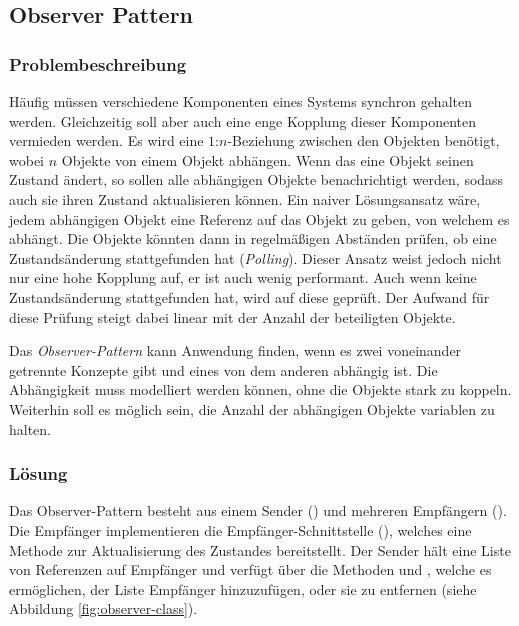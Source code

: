 \subsection{Observer Pattern}


\subsubsection*{Problembeschreibung}

Häufig müssen verschiedene Komponenten eines Systems synchron gehalten werden. Gleichzeitig soll aber auch eine enge Kopplung dieser Komponenten vermieden werden. Es wird eine $1$:$n$-Beziehung zwischen den Objekten benötigt, wobei $n$ Objekte von einem Objekt abhängen. Wenn das eine Objekt seinen Zustand ändert, so sollen alle abhängigen Objekte benachrichtigt werden, sodass auch sie ihren Zustand aktualisieren können. Ein naiver Lösungsansatz wäre, jedem abhängigen Objekt eine Referenz auf das Objekt zu geben, von welchem es abhängt. Die Objekte könnten dann in regelmäßigen Abständen prüfen, ob eine Zustandsänderung stattgefunden hat (\emph{Polling}). Dieser Ansatz weist jedoch nicht nur eine hohe Kopplung auf, er ist auch wenig performant. Auch wenn keine Zustandsänderung stattgefunden hat, wird auf diese geprüft. Der Aufwand für diese Prüfung steigt dabei linear mit der Anzahl der beteiligten Objekte.

Das \emph{Observer-Pattern} kann Anwendung finden, wenn es zwei voneinander getrennte Konzepte gibt und eines von dem anderen abhängig ist. Die Abhängigkeit muss modelliert werden können, ohne die Objekte stark zu koppeln. Weiterhin soll es möglich sein, die Anzahl der abhängigen Objekte variablen zu halten. \cite{gamma_design_1995}

\subsubsection*{Lösung}

Das Observer-Pattern besteht aus einem Sender () und mehreren Empfängern (). Die Empfänger implementieren die Empfänger-Schnittstelle (), welches eine Methode  zur Aktualisierung des Zustandes bereitstellt. Der Sender hält eine Liste von Referenzen auf Empfänger und verfügt über die Methoden  und , welche es ermöglichen, der Liste Empfänger hinzuzufügen, oder sie zu entfernen (siehe Abbildung \ref{fig:observer-class}).


